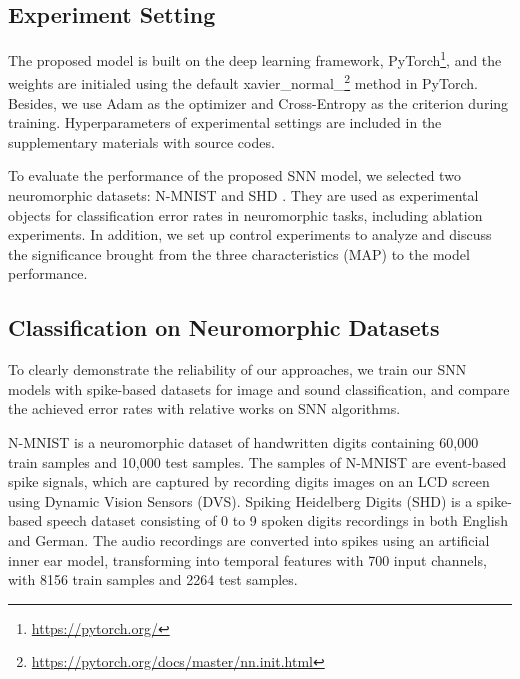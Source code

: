 \documentclass{article}
\begin{document}
\subsection{Experiment Setting}


The proposed model is built on the deep learning framework, PyTorch\footnote{\url{https://pytorch.org/}}, and the weights are initialed using the default xavier\_normal\_\footnote{\url{https://pytorch.org/docs/master/nn.init.html}} method in PyTorch. Besides, we use Adam as the optimizer and Cross-Entropy as the criterion during training. Hyperparameters of experimental settings are included in the supplementary materials with source codes.


To evaluate the performance of the proposed SNN model, we selected two neuromorphic datasets: N-MNIST \cite{orchard_converting_2015} and SHD \cite{cramer_heidelberg_2020}. They are used as experimental objects for classification error rates in neuromorphic tasks, including ablation experiments. In addition, we set up control experiments to analyze and discuss the significance brought from the three characteristics (MAP) to the model performance. 



\subsection{Classification on Neuromorphic Datasets}
To clearly demonstrate the reliability of our approaches, we train our SNN models with spike-based datasets for image and sound classification, and compare the achieved error rates with relative works on SNN algorithms.

N-MNIST is a neuromorphic dataset of handwritten digits containing 60,000 train samples and 10,000 test samples. The samples of N-MNIST are event-based spike signals, which are captured by recording digits images on an LCD screen using Dynamic Vision Sensors (DVS). 
Spiking Heidelberg Digits (SHD) is a spike-based speech dataset consisting of 0 to 9 spoken digits recordings in both English and German. The audio recordings are converted into spikes using an artiﬁcial inner ear model, transforming into temporal features with 700 input channels, with 8156 train samples and 2264 test samples.
\end{document}
